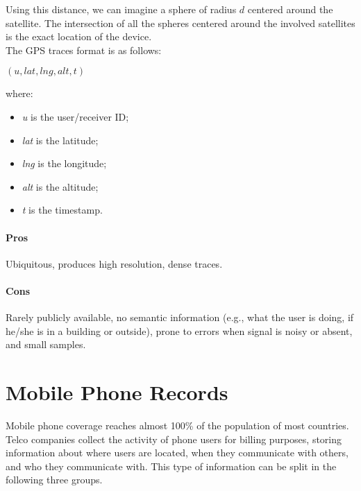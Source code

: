 Using this distance, we can imagine a sphere of radius $d$ centered around the satellite. The intersection of all the spheres centered around the involved satellites is the exact location of the device. 
\\
The GPS traces format is as follows:
\begin{center}
$(u, lat, lng, alt, t)$
\end{center}
where:
\begin{itemize}[itemsep=-5pt, label=-]
    \item \textit{u} is the user/receiver ID;
    \item \textit{lat} is the latitude;
    \item \textit{lng} is the longitude;
    \item \textit{alt} is the altitude;
    \item \textit{t} is the timestamp.
\end{itemize}

\paragraph{Pros}
Ubiquitous, produces high resolution, dense traces.

\paragraph{Cons}
Rarely publicly available, no semantic information (e.g., what the user is doing, if he/she is in a building or outside), prone to errors when signal is noisy or absent, and small samples.

\section{Mobile Phone Records}

Mobile phone coverage reaches almost 100\% of the population of most countries. Telco companies collect the activity of phone users for billing purposes, storing information about where users are located, when they communicate with others, and who they communicate with. This type of information can be split in the following three groups.


